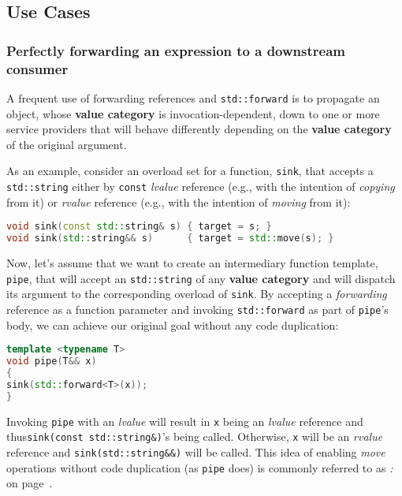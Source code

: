 \subsection[Use Cases]{Use Cases}\label{use-cases-forwardingref}

\subsubsection[Perfectly forwarding an expression to a downstream consumer]{Perfectly forwarding an expression to a downstream consumer}\label{perfectly-forwarding-an-expression-to-a-downstream-consumer}

A frequent use of forwarding references and \texttt{std::forward} is to
propagate an object, whose \textbf{value category} is
invocation-dependent, down to one or more service providers that will
behave differently depending on the \textbf{value category} of the
original argument.

As an example, consider an overload set for a function, \texttt{sink},
that accepts a \texttt{std::string} either by \texttt{const}
\emph{lvalue} reference (e.g., with the intention of \textit{copying} from it) or
\emph{rvalue} reference (e.g., with the intention of \textit{moving} from it):

\begin{lstlisting}[language=C++]
void sink(const std::string& s) { target = s; }
void sink(std::string&& s)      { target = std::move(s); }
\end{lstlisting}

\noindent Now, let's assume that we want to create an intermediary function
template, \texttt{pipe}, that will accept an \texttt{std::string} of any
\textbf{value category} and will dispatch its argument to the
corresponding overload of \texttt{sink}. By accepting a
\emph{forwarding} reference as a function parameter and invoking
\texttt{std::forward} as part of \texttt{pipe}'s body, we can achieve
our original goal without any code duplication:

\begin{lstlisting}[language=C++]
template <typename T>
void pipe(T&& x)
{
sink(std::forward<T>(x));
}
\end{lstlisting}

\noindent Invoking \texttt{pipe} with an \emph{lvalue} will result in \texttt{x}
being an \emph{lvalue} reference and thus\linebreak[4]%
\mbox{\texttt{sink(const}~\texttt{std::string\&)}'s} being called. Otherwise,
\texttt{x} will be an \emph{rvalue} reference and
\texttt{sink(std::string\&\&)} will be called. This idea of enabling
\emph{move} operations without code duplication (as \texttt{pipe} does)
is commonly referred to as \textit{: } on page~\pageref{perfect-forwarding-for-generic-factory-functions}.

